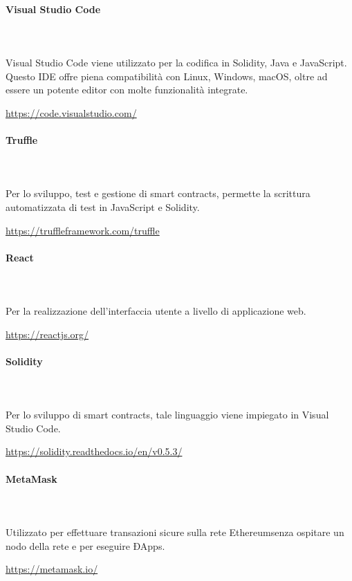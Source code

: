 		\paragraph{Visual Studio Code} \mbox{}\\ \mbox{}\\
		Visual Studio Code viene utilizzato per la codifica in Solidity, Java e JavaScript. Questo 
		IDE offre piena compatibilità con Linux, Windows, macOS, oltre ad essere un 
		potente editor con molte funzionalità integrate. \newline
		\centerline{\url{https://code.visualstudio.com/}}

			
		\paragraph{Truffle} \mbox{}\\ \mbox{}\\
		Per lo sviluppo, test e gestione di smart contracts\glo, permette la scrittura automatizzata di test in JavaScript e Solidity\glo.\newline
		\centerline{\url{https://truffleframework.com/truffle}}
		
		\paragraph{React} \mbox{}\\ \mbox{}\\ 
		Per la realizzazione dell'interfaccia utente a livello di applicazione web.\newline
		\centerline{\url{https://reactjs.org/}}
		
		\paragraph{Solidity} \mbox{}\\ \mbox{}\\ 
		Per lo sviluppo di smart contracts\glo, tale linguaggio viene impiegato in Visual Studio Code.\newline
		\centerline{\url{https://solidity.readthedocs.io/en/v0.5.3/}}
		
		\paragraph{MetaMask} \mbox{}\\ \mbox{}\\ 
		Utilizzato per effettuare transazioni sicure sulla rete Ethereum\glosp senza ospitare un nodo della rete e per eseguire ÐApps\glo. \newline
		\centerline{\url{https://metamask.io/}}
		
